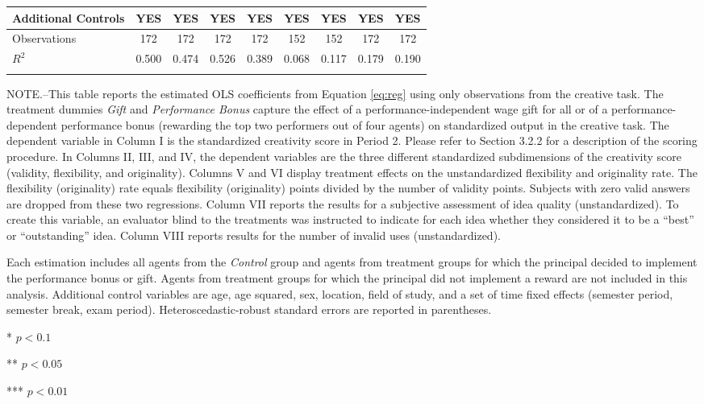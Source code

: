 \begin{landscape}
\begin{table}[h]
\begin{center}
{\begin{tabular}{lcccccccc}
\midrule
 Additional Controls & YES & YES & YES & YES & YES & YES & YES & YES \\
\midrule
Observations        &         172   &         172   &         172   &         172   &         152   &         152   &         172   &         172   \\
$R^2$               &       0.500   &       0.474   &       0.526   &       0.389   &       0.068   &       0.117   &       0.179   &       0.190   \\
\hline\noalign{\medskip}
\end{tabular}}
\begin{minipage}{\textwidth} \setlength{\parindent}{15pt}
\footnotesize NOTE.--This table reports the estimated OLS coefficients from Equation \ref{eq:reg} using only observations from the creative task. 
The treatment dummies \textit{Gift} and \textit{Performance Bonus} capture the effect of a performance-independent wage gift for all or of a performance-dependent performance bonus (rewarding the top two performers out of four agents) on standardized output in the creative task. 
The dependent variable in Column I is the standardized creativity score in Period 2. 
Please refer to Section 3.2.2 for a description of the scoring procedure. 
In Columns II, III, and IV, the dependent variables are the three different standardized subdimensions of the creativity score (validity, flexibility, and originality). 
Columns V and VI display treatment effects on the unstandardized flexibility and originality rate. 
The flexibility (originality) rate equals flexibility (originality) points divided by the number of validity points. Subjects with zero valid answers are dropped from these two regressions. 
Column VII reports the results for a subjective assessment of idea quality (unstandardized). To create this variable, an evaluator blind to the treatments was instructed to indicate for each idea whether they considered it to be a ``best'' or ``outstanding'' idea. 
Column VIII reports results for the number of invalid uses (unstandardized). 

Each estimation includes all agents from the \textit{Control} group and agents from treatment groups for which the principal decided to implement the performance bonus or gift. Agents from treatment groups for which the principal did not implement a reward are not included in this analysis. 
Additional control variables are age, age squared, sex, location, field of study, and a set of time fixed effects (semester period, semester break, exam period). 
Heteroscedastic-robust standard errors are reported in parentheses. 

*   $ p < 0.1  $

**  $ p < 0.05 $

*** $ p < 0.01 $
\end{minipage}
\end{center}
\end{table}
\end{landscape}
